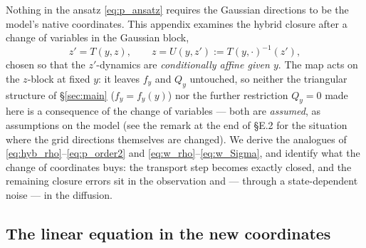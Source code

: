 \documentclass[11pt,a4paper]{article}
\theoremstyle{plain}
\theoremstyle{definition}
\theoremstyle{remark}
\begin{document}
Nothing in the ansatz \eqref{eq:p_ansatz} requires the Gaussian directions to be the model's native coordinates. This appendix examines the hybrid closure after a change of variables in the Gaussian block,
\begin{equation}
  z' = T(y,z), \qquad z = U(y,z') := T(y,\cdot)^{-1}(z'),
  \label{eq:E_T}
\end{equation}
chosen so that the $z'$-dynamics are \emph{conditionally affine given $y$}. The map acts on the $z$-block at fixed $y$: it leaves $f_y$ and $Q_y$ untouched, so neither the triangular structure of \S\ref{sec:main} ($f_y=f_y(y)$) nor the further restriction $Q_y=0$ made here is a consequence of the change of variables --- both are \emph{assumed}, as assumptions on the model (see the remark at the end of \S E.2 for the situation where the grid directions themselves are changed). We derive the analogues of \eqref{eq:hyb_rho}--\eqref{eq:p_order2} and \eqref{eq:w_rho}--\eqref{eq:w_Sigma}, and identify what the change of coordinates buys: the transport step becomes exactly closed, and the remaining closure errors sit in the observation and --- through a state-dependent noise --- in the diffusion.

\subsection{The linear equation in the new coordinates}
\end{document}
